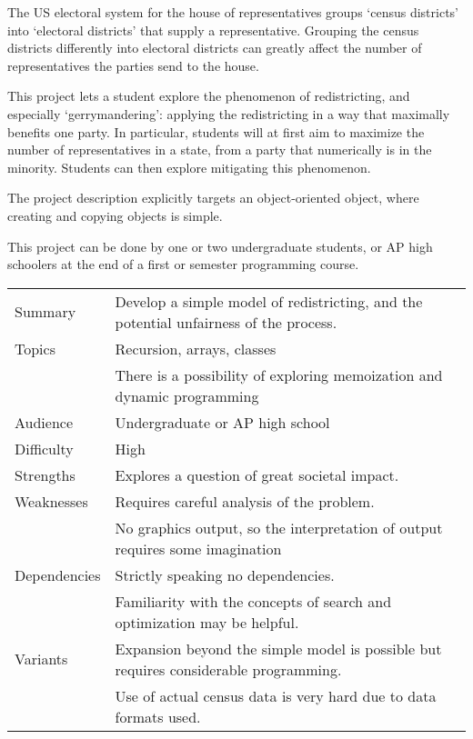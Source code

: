 
The US electoral system for the house of representatives
groups `census districts' into `electoral districts' that
supply a representative. Grouping the census districts
differently into electoral districts can greatly affect
the number of representatives the parties send to the house.

This project lets a student explore the phenomenon of redistricting,
and especially `gerrymandering': applying the redistricting in a way
that maximally benefits one party.
In particular, students will at first aim to maximize
the number of representatives in a state, from a party
that numerically is in the minority.
Students can then explore mitigating this phenomenon.

The project description explicitly targets an object-oriented
object, where creating and copying objects is simple.

This project can be done by one or two undergraduate students,
or AP high schoolers
at the end of a first or semester programming course.

\newpage

\begin{tabular}{|l|p{5in}|}
  \hline
  Summary&Develop a simple model of redistricting, and the potential unfairness
  of the process.
  \\
  Topics&Recursion, arrays, classes\\
  &There is a possibility of exploring memoization and dynamic programming
  \\
  Audience&Undergraduate or AP high school
  \\
  Difficulty&High
  \\
  Strengths&Explores a question of great societal impact.
  \\
  Weaknesses&Requires careful analysis of the problem.\\
  &No graphics output, so the interpretation of output requires some imagination
  \\
  Dependencies&Strictly speaking no dependencies.\\
  &Familiarity with the concepts of search and optimization may be helpful.
  \\
  Variants&Expansion beyond the simple model is possible but requires
  considerable programming.\\
  &Use of actual census data is very hard due to data formats used.
  \\
  \hline
\end{tabular}
